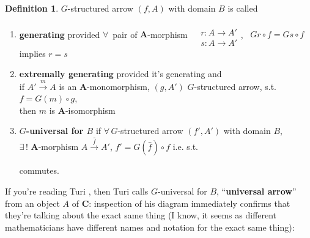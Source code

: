 \documentclass[twoside,landscape,10pt]{amsart}
\theoremstyle{plain}
\theoremstyle{definition}
\newtheorem{definition}{Definition}
\theoremstyle{remark}
\begin{document}
\begin{multicols*}{2}
\begin{definition}
$G$-structured arrow $(f,A)$ with domain $B$ is called
\begin{enumerate}
  \item \textbf{generating} provided $\forall \, $ pair of $\mathbf{A}$-morphism $\begin{aligned} & \quad \\
    & r : A \to A' \\ 
    & s:A \to A'\end{aligned}$, \qquad \, $Gr\circ f = Gs\circ f$ implies $r=s$
  \item \textbf{extremally generating} provided it's generating and \\
if $A' \xrightarrow{m} A$ is an $\mathbf{A}$-monomorphism, $(g,A')$ $G$-structured arrow, s.t. $f=G(m)\circ g$, \\
\phantom{ if } then $m$ is $\mathbf{A}$-isomorphism
  \item \textbf{ $G$-universal for $B$ } if $\forall \, G$-structured arrow $(f',A')$ with domain $B$, \\
    $\exists \, ! $ $\mathbf{A}$-morphism $A \xrightarrow{ \widehat{f}} A'$, $f'=G(\widehat{f})\circ f$ i.e. s.t. 


commutes. 
\end{enumerate}

\end{definition}

If you're reading Turi \cite{Turi2001}, then Turi calls $G$-universal for $B$, ``\textbf{universal arrow}'' from an object $A$ of $\mathbf{C}$: inspection of his diagram immediately confirms that they're talking about the exact same thing (I know, it seems as different mathematicians have different names and notation for the exact same thing):


\end{multicols*}
\end{document}
